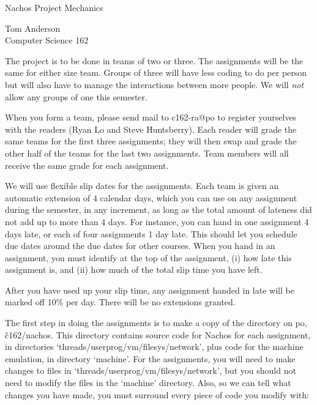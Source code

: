 


\begin{center}
{\large Nachos Project Mechanics
\vspace{.2in}

Tom Anderson\\
Computer Science 162
}
\end{center}

The project is to be done in teams of two or three.  The assignments
will be the same for either size team.  Groups of three will have
less coding to do per person but will also have to manage the
interactions between more people.
We will {\em not} allow any groups of one this semester.

When you form a team, please send mail to c162-ra@po to register
yourselves with the readers (Ryan Lo and Steve Huntsberry).  Each reader
will grade the same teams for the first three assignments; they will
then swap and grade the other half of the teams for the last two assignments.
Team members will all receive the same grade for each assignment.

We will use flexible slip dates for the assignments.
Each team is given an automatic extension of 4 calendar days,
which you can use on any assignment during the semester, in any
increment, as long as the total amount of lateness did not add up
to more than 4 days.  For instance, you can hand in one assignment
4 days late, or each of four assignments 1 day late.
This should let you schedule due dates around the due dates for
other courses.  When you hand in an assignment, you must
identify at the top of the assignment, (i) how late this assignment is,
and (ii) how much of the total slip time you have left.

After you have used up your slip time, any assignment handed in late
will be marked off 10\% per day.  There will be no extensions granted.

The first step in doing the assignments is to make a copy
of the directory on po, \~c162/nachos.
This directory contains source code for Nachos for each assignment,
in directories `threads/userprog/vm/filesys/network', plus code for
the machine emulation, in
directory `machine'.  For the assignments, you will need to make changes
to files in `threads/userprog/vm/filesys/network', but you should not need
to modify the files in
the `machine' directory.  Also, so we can tell what changes you have
made, you must surround every piece of code you modify with:


